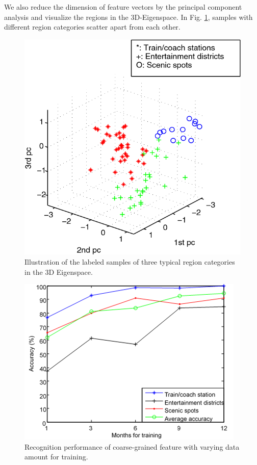 \documentclass[a4paper, 10pt, conference]{ieeeconf}      %
\begin{document}
We also reduce the dimension of feature vectors by the principal component analysis and visualize the regions in the 3D-Eigenspace. In Fig. \ref{fig:my_label_4}, samples with different region categories scatter apart from each other.

\begin{figure}[htbp]
    \centering
    \includegraphics{fig/f6.png}
    \caption{Illustration of the labeled samples of three typical region categories in the 3D Eigenspace.}
    \label{fig:my_label_4}
\end{figure}
\begin{figure}[ht]
    \centering
    \includegraphics{fig/f7.png}
    \caption{Recognition performance of coarse-grained feature with varying data amount for training.}
    \label{fig:my_label_5}
\end{figure}
\end{document}
